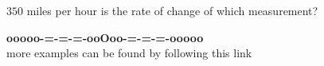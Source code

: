 \documentclass{ximera}
\begin{document}
\begin{question} 


$350$ miles per hour is the rate of change of which measurement?

\begin{multipleChoice}
\end{multipleChoice}

\end{question}















\begin{center}
\textbf{\textcolor{green!50!black}{ooooo-=-=-=-ooOoo-=-=-=-ooooo}} \\

more examples can be found by following this link\\ 

\end{center}
\end{document}
